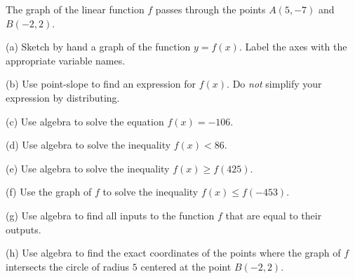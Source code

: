 \documentclass{ximera}
\begin{document}
\begin{question}  \label{Qdfg54t54t}
The graph of the linear function $f$ passes through the points $A(5,-7)$ and $B(-2,2)$.

(a) Sketch by hand a graph of the function $y=f(x)$. Label the axes with the appropriate variable names.

(b) Use point-slope to find an expression for $f(x)$. Do \emph{not} simplify your expression by distributing.

(c) Use algebra to solve the equation $f(x) = -106$.

(d) Use algebra to solve the inequality $f(x) < 86$.

(e) Use algebra to solve the inequality $f(x) \geq f(425)$.

(f) Use the graph of $f$ to solve the inequality $f(x)\leq f(-453)$.

(g) Use algebra to find all inputs to the function $f$ that are equal to their outputs.

(h) Use algebra to find the exact coordinates of the points where the graph of $f$ intersects the circle of radius $5$ centered at the point $B(-2,2)$.


\end{question}
\end{document}
